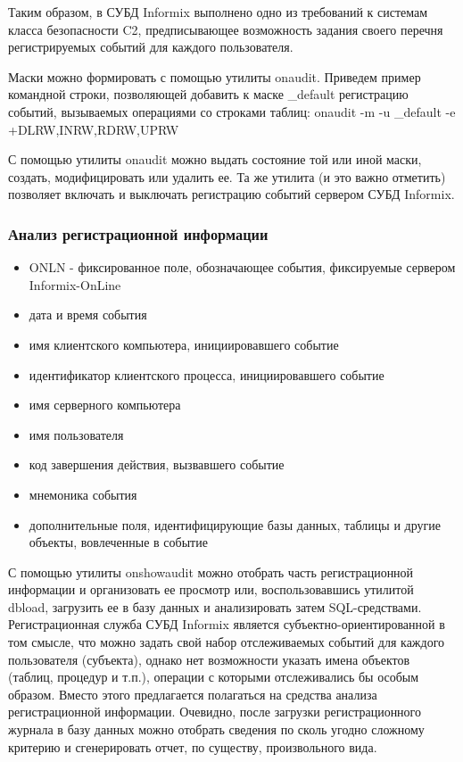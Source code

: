 Таким образом, в СУБД Informix выполнено одно из требований к системам класса безопасности C2,
предписывающее возможность задания своего перечня регистрируемых событий для каждого пользователя.

Маски можно формировать с помощью утилиты onaudit. Приведем пример командной строки, позволяющей
добавить к маске \_default регистрацию событий, вызываемых операциями со строками таблиц:
onaudit -m -u \_default -e +DLRW,INRW,RDRW,UPRW

С помощью утилиты onaudit можно выдать состояние той или иной маски, создать, модифицировать или
удалить ее. Та же утилита (и это важно отметить) позволяет включать и выключать регистрацию событий
сервером СУБД Informix.


\subsubsection{Анализ регистрационной информации}
\begin{itemize}
    \item ONLN - фиксированное поле, обозначающее события, фиксируемые сервером Informix-OnLine
    \item дата и время события
    \item имя клиентского компьютера, инициировавшего событие
    \item идентификатор клиентского процесса, инициировавшего событие
    \item имя серверного компьютера
    \item имя пользователя
    \item код завершения действия, вызвавшего событие
    \item мнемоника события
    \item дополнительные поля, идентифицирующие базы данных, таблицы и другие объекты,
        вовлеченные в событие
\end{itemize}

С помощью утилиты onshowaudit можно отобрать часть регистрационной информации и организовать ее
просмотр или, воспользовавшись утилитой dbload, загрузить ее в базу данных и анализировать затем
SQL-средствами. Регистрационная служба СУБД Informix является субъектно-ориентированной в том
смысле, что можно задать свой набор отслеживаемых событий для каждого пользователя (субъекта),
однако нет возможности указать имена объектов (таблиц, процедур и т.п.), операции с которыми
отслеживались бы особым образом. Вместо этого предлагается полагаться на средства анализа
регистрационной информации. Очевидно, после загрузки регистрационного журнала в базу данных можно
отобрать сведения по сколь угодно сложному критерию и сгенерировать отчет, по существу,
произвольного вида.

